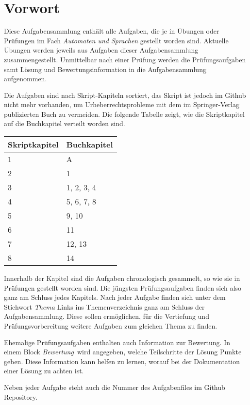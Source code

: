 %
%
%
\chapter*{Vorwort}
Diese Aufgabensammlung enthält alle Aufgaben, die je in Übungen oder
Prüfungen im Fach {\em Automaten und Sprachen} gestellt worden sind.
Aktuelle Übungen werden jeweils aus Aufgaben dieser Aufgabensammlung
zusammengestellt.
Unmittelbar nach einer Prüfung werden die Prüfungsaufgaben samt
Lösung und Bewertungsinformation in die Aufgabensammlung aufgenommen.

Die Aufgaben sind nach Skript-Kapiteln sortiert, das Skript ist
jedoch im Github nicht mehr vorhanden, um Urheberrechtsprobleme
mit dem im Springer-Verlag publizierten Buch zu vermeiden.
Die folgende Tabelle zeigt, wie die Skriptkapitel auf die Buchkapitel
verteilt worden sind.
\begin{center}
\begin{tabular}{ll}
\hline
Skriptkapitel &Buchkapitel \\
\hline
1 &  A          \\
2 &  1          \\
3 &  1, 2, 3, 4 \\
4 &  5, 6, 7, 8 \\
5 &  9, 10      \\
6 &  11         \\
7 &  12, 13     \\
8 &  14         \\
\hline
\end{tabular}
\end{center}
Innerhalb der Kapitel sind die Aufgaben chronologisch gesammelt,
so wie sie in Prüfungen gestellt worden sind.
Die jüngsten Prüfungsaufgaben finden sich also ganz am Schluss jedes
Kapitels.
Nach jeder Aufgabe finden sich unter dem Stichwort {\em Thema} Links
ins Themenverzeichnis ganz am Schluss der Aufgabensammlung.
Diese sollen ermöglichen, für die Vertiefung und Prüfungsvorbereitung
weitere Aufgaben zum gleichen Thema zu finden.

Ehemalige Prüfungsaufgaben enthalten auch Information zur Bewertung.
In einem Block {\em Bewertung} wird angegeben, welche Teilschritte
der Lösung Punkte geben.
Diese Information kann helfen zu lernen, worauf bei der Dokumentation
einer Lösung zu achten ist.

Neben jeder Aufgabe steht auch die Nummer des Aufgabenfiles im
Github Repository.

